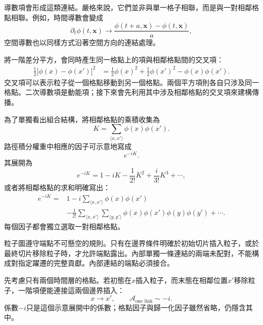 導數項會形成這類連結。嚴格來說，它們並非與單一格子相聯，而是與一對相鄰格點相聯。例如，時間導數會變成
\begin{equation}
\partial_t\phi(t,\mathbf{x})
\longrightarrow
\frac{\phi(t+a,\mathbf{x})-\phi(t,\mathbf{x})}{a},
\end{equation}
空間導數也以同樣方式沿著空間方向的連結處理。

\begin{classroomqa}
\end{classroomqa}

將一階差分平方，會同時產生同一格點上的項與相鄰格點間的交叉項：
\begin{align}
\frac{1}{2}\bigl[\phi(x)-\phi(x')\bigr]^2
&=
\frac{1}{2}\phi(x)^2
+\frac{1}{2}\phi(x')^2
-\phi(x)\phi(x').
\end{align}
交叉項可以表示粒子從一個格點移動到另一個格點。兩個平方項則各自只涉及同一格點。二次導數項是動能項；接下來會先利用其中涉及相鄰格點的交叉項來建構傳播。

為了單獨看出組合結構，將相鄰格點的乘積收集為
\begin{equation}
K=\sum_{\langle x,x'\rangle}\phi(x)\phi(x').
\end{equation}
路徑積分權重中相應的因子可示意地寫成
\begin{equation}
e^{-iK}.
\end{equation}
其展開為
\begin{equation}
e^{-iK}
=1-iK-\frac{1}{2!}K^2+\frac{i}{3!}K^3+\cdots,
\end{equation}
或者將相鄰格點的求和明確寫出：
\begin{align}
e^{-iK}
={}&1
-i\sum_{\langle x,x'\rangle}\phi(x)\phi(x')
\nonumber\\
&-\frac{1}{2!}
\sum_{\langle x,x'\rangle}
\sum_{\langle y,y'\rangle}
\phi(x)\phi(x')\phi(y)\phi(y')
+\cdots .
\end{align}
每個因子都會獨立選取一對相鄰格點。

粒子圖遵守端點不可懸空的規則。只有在邊界條件明確於初始切片插入粒子，或於最終切片移除粒子時，才允許端點露出。內部單獨一條連結的兩端未配對，不能構成對指定躍遷的完整貢獻。內部連結的端點必須接合。

先考慮只有兩個時間層的格點。若初態在\(x\)插入粒子，而末態在相鄰位置\(x'\)移除粒子，一階項便能連接這兩個邊界插入：
\begin{equation}
x\longrightarrow x',
\qquad
\mathcal{A}_{\text{one link}}\sim -i.
\end{equation}
係數\(-i\)只是這個示意展開中的係數；格點因子與歸一化因子雖然省略，仍隱含其中。

